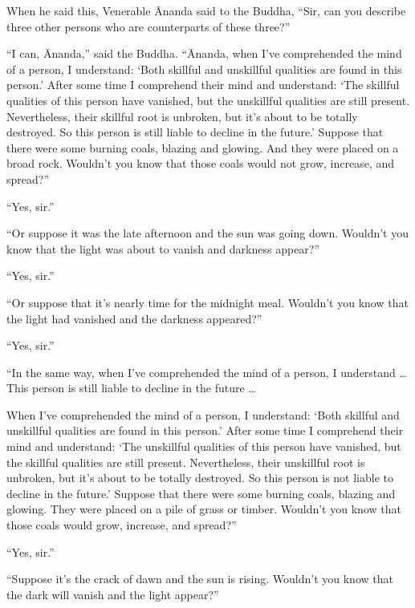 \documentclass[12pt,openany]{book}%
\begin{document}
When he said this, Venerable Ānanda said to the Buddha, “Sir, can you describe three other persons who are counterparts of these three?” 

“I can, Ānanda,” said the Buddha. “Ānanda, when I’ve comprehended the mind of a person, I understand: ‘Both skillful and unskillful qualities are found in this person.’ After some time I comprehend their mind and understand: ‘The skillful qualities of this person have vanished, but the unskillful qualities are still present. Nevertheless, their skillful root is unbroken, but it’s about to be totally destroyed. So this person is still liable to decline in the future.’ Suppose that there were some burning coals, blazing and glowing. And they were placed on a broad rock. Wouldn’t you know that those coals would not grow, increase, and spread?” 

“Yes, sir.” 

“Or suppose it was the late afternoon and the sun was going down. Wouldn’t you know that the light was about to vanish and darkness appear?” 

“Yes, sir.” 

“Or suppose that it’s nearly time for the midnight meal. Wouldn’t you know that the light had vanished and the darkness appeared?” 

“Yes, sir.” 

“In the same way, when I’ve comprehended the mind of a person, I understand … This person is still liable to decline in the future … 

When I’ve comprehended the mind of a person, I understand: ‘Both skillful and unskillful qualities are found in this person.’ After some time I comprehend their mind and understand: ‘The unskillful qualities of this person have vanished, but the skillful qualities are still present. Nevertheless, their unskillful root is unbroken, but it’s about to be totally destroyed. So this person is not liable to decline in the future.’ Suppose that there were some burning coals, blazing and glowing. They were placed on a pile of grass or timber. Wouldn’t you know that those coals would grow, increase, and spread?” 

“Yes, sir.” 

“Suppose it’s the crack of dawn and the sun is rising. Wouldn’t you know that the dark will vanish and the light appear?” 
\end{document}
